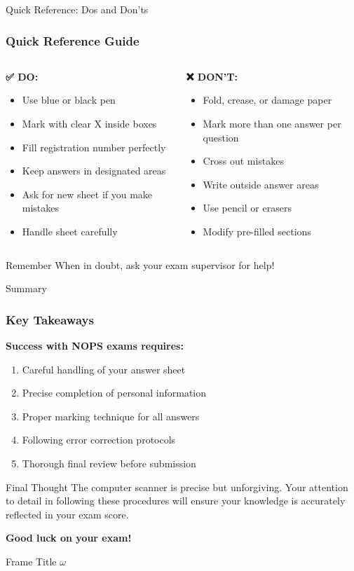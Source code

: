\documentclass{beamer}
\begin{document}
\begin{frame}{Quick Reference: Dos and Don'ts}
\frametitle{Quick Reference Guide}
\begin{columns}
\begin{column}{0.5\textwidth}
\textbf{✅ DO:}
\begin{itemize}
\item Use blue or black pen
\item Mark with clear X inside boxes
\item Fill registration number perfectly
\item Keep answers in designated areas
\item Ask for new sheet if you make mistakes
\item Handle sheet carefully
\end{itemize}
\end{column}

\begin{column}{0.5\textwidth}
\textbf{❌ DON'T:}
\begin{itemize}
\item Fold, crease, or damage paper
\item Mark more than one answer per question
\item Cross out mistakes
\item Write outside answer areas
\item Use pencil or erasers
\item Modify pre-filled sections
\end{itemize}
\end{column}
\end{columns}

\begin{block}{Remember}
When in doubt, ask your exam supervisor for help!
\end{block}
\end{frame}

\begin{frame}{Summary}
\frametitle{Key Takeaways}
\textbf{Success with NOPS exams requires:}
\begin{enumerate}
\item Careful handling of your answer sheet
\item Precise completion of personal information
\item Proper marking technique for all answers
\item Following error correction protocols
\item Thorough final review before submission
\end{enumerate}

\begin{block}{Final Thought}
The computer scanner is precise but unforgiving. Your attention to detail in following these procedures will ensure your knowledge is accurately reflected in your exam score.
\end{block}

\textbf{Good luck on your exam!}

\end{frame}


\begin{frame}{Frame Title}
    $\omega$
\end{frame}
\end{document}
